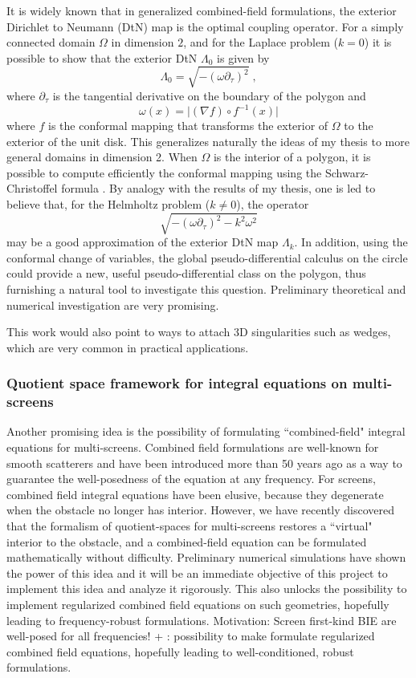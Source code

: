 \documentclass[]{report}
\newcommand{\rh}[1]{{\color{magenta}#1}}
\newcommand{\ma}[1]{{\color{green}#1}}
\begin{document}
It is widely known that in generalized combined-field formulations, the exterior Dirichlet
to Neumann (DtN) map is the optimal coupling operator. For a simply connected domain
$\Omega$ in dimension $2$, and for the Laplace problem ($k = 0$) it is possible to show
that the exterior DtN $\Lambda_0$ is given by
\[\Lambda_0 = \sqrt{-(\omega \partial_\tau)^2}\;,\]
where $\partial_\tau$ is the tangential derivative on the boundary of the polygon
and \[\omega(x) = \lvert (\nabla f) \circ f^{-1}(x)\rvert\] where $f$ is the conformal
mapping that transforms the exterior of $\Omega$ to the exterior of the unit disk. This
generalizes naturally the ideas of my thesis to more general domains in dimension 2. When
$\Omega$ is the interior of a polygon, it is possible to compute efficiently the conformal
mapping using the Schwarz-Christoffel formula \cite{driscoll2002schwarz}. By
analogy with the results of my thesis, one is led to believe that, for the Helmholtz
problem ($k \neq 0$), the operator
\[\sqrt{-(\omega \partial_\tau)^2 - k^2\omega^2}\]
may be a good approximation of the exterior DtN map $\Lambda_k$. \ma{In addition, using the conformal change of variables, the global pseudo-differential calculus on the circle \cite{turunen1998symbol} could provide a new, useful pseudo-differential class on the polygon, thus furnishing a natural tool to investigate this question}. Preliminary theoretical and numerical
investigation are very promising.

This work would also point to ways to attach 3D singularities such as wedges, which are
very common  in practical applications.

\subsubsection*{Quotient space framework for integral equations on multi-screens}


Another promising idea is the possibility of formulating ``combined-field" integral
equations for multi-screens. Combined field formulations are well-known for smooth
scatterers and have been introduced more than 50 years ago
\cite{brakhage1965dirichletsehe} as a way to guarantee the well-posedness of the equation
at any frequency. For screens, combined field integral equations have been elusive,
because they degenerate when the obstacle no longer has interior.  However, we have
recently discovered that the formalism of \ma{quotient-spaces for multi-screens} restores a ``virtual" interior to
the obstacle, and a combined-field equation can be formulated mathematically without
difficulty. Preliminary numerical simulations have shown the power of this idea and it
will be an immediate objective of this project to implement this idea and analyze it
rigorously.  This also unlocks the possibility to implement regularized combined field equations on such geometries, hopefully leading to frequency-robust formulations. \rh{Motivation: Screen first-kind BIE are well-posed for all frequencies! }\ma{+ : possibility to make formulate regularized combined field equations, hopefully leading to well-conditioned, robust formulations.}
\end{document}
